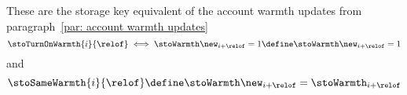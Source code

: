 \label{par: storage key warmth updates} These are the storage key equivalent of the account warmth updates from paragraph~\ref{par: account warmth updates}
\[
	\stoTurnOnWarmth
	{i}{\relof}
	\iff \stoWarmth\new _{i + \relof} = 1
	\define
	\stoWarmth\new _{i + \relof} = 1
\]
and
\[
	\stoSameWarmth
	{i}{\relof}
	\define
	\stoWarmth\new _{i + \relof} = \stoWarmth _{i + \relof}
\]
